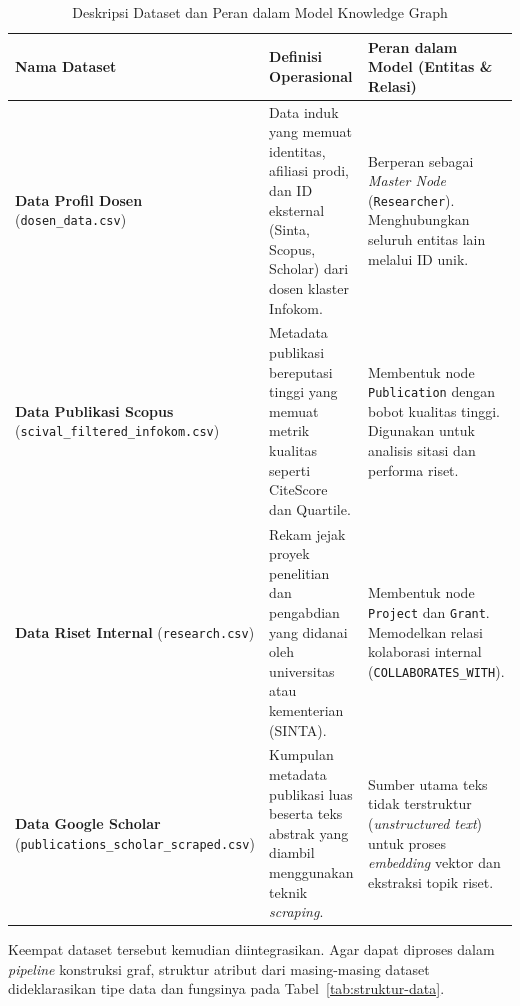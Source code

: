 \begin{table}[htbp]
    \centering
    \caption{Deskripsi Dataset dan Peran dalam Model Knowledge Graph}
    \label{tab:deskripsi-dataset}
    \renewcommand{\arraystretch}{1.5} %
    \begin{tabular}{|p{4.5cm}|p{5cm}|p{5.5cm}|}
        \hline
        \textbf{Nama Dataset} & \textbf{Definisi Operasional} & \textbf{Peran dalam Model (Entitas \& Relasi)} \\ 
        \hline
        \textbf{Data Profil Dosen} \newline (\texttt{dosen\_data.csv}) & 
        Data induk yang memuat identitas, afiliasi prodi, dan ID eksternal (Sinta, Scopus, Scholar) dari dosen klaster Infokom. & 
        Berperan sebagai \textit{Master Node} (\texttt{Researcher}). Menghubungkan seluruh entitas lain melalui ID unik. \\ 
        \hline
        \textbf{Data Publikasi Scopus} \newline (\texttt{scival\_filtered\_infokom.csv}) & 
        Metadata publikasi bereputasi tinggi yang memuat metrik kualitas seperti CiteScore dan Quartile. & 
        Membentuk node \texttt{Publication} dengan bobot kualitas tinggi. Digunakan untuk analisis sitasi dan performa riset. \\ 
        \hline
        \textbf{Data Riset Internal} \newline (\texttt{research.csv}) & 
        Rekam jejak proyek penelitian dan pengabdian yang didanai oleh universitas atau kementerian (SINTA). & 
        Membentuk node \texttt{Project} dan \texttt{Grant}. Memodelkan relasi kolaborasi internal (\texttt{COLLABORATES\_WITH}). \\ 
        \hline
        \textbf{Data Google Scholar} \newline (\texttt{publications\_scholar\_scraped.csv}) & 
        Kumpulan metadata publikasi luas beserta teks abstrak yang diambil menggunakan teknik \textit{scraping}. & 
        Sumber utama teks tidak terstruktur (\textit{unstructured text}) untuk proses \textit{embedding} vektor dan ekstraksi topik riset. \\ 
        \hline
    \end{tabular}
\end{table}

Keempat dataset tersebut kemudian diintegrasikan. Agar dapat diproses dalam \textit{pipeline} konstruksi graf, struktur atribut dari masing-masing dataset dideklarasikan tipe data dan fungsinya pada Tabel~\ref{tab:struktur-data}.

